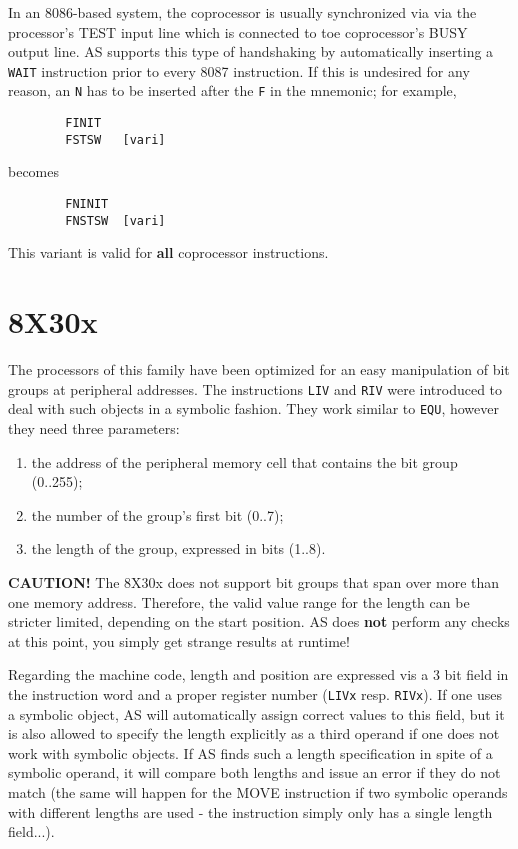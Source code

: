 \documentclass[12pt,twoside]{report}
\newcommand{\bb}[1]{{\bf #1}}
\newcommand{\tty}[1]{{\tt #1}}
\begin{document}
In an 8086-based system, the coprocessor is usually synchronized via
via the processor's TEST input line which is connected to toe
coprocessor's BUSY output line.  AS supports this type of handshaking
by automatically inserting a \tty{WAIT} instruction prior to every 8087
instruction.  If this is undesired for any reason, an \tty{N} has to be
inserted after the \tty{F} in the mnemonic; for example,
\begin{verbatim}
        FINIT
        FSTSW   [vari]
\end{verbatim}
becomes
\begin{verbatim}
        FNINIT
        FNSTSW  [vari]
\end{verbatim}
This variant is valid for \bb{all} coprocessor instructions.


\section{8X30x}
\label{8X30xSpec}

The processors of this family have been optimized for an easy manipulation
of bit groups at peripheral addresses.  The instructions \tty{LIV} and
\tty{RIV} were introduced to deal with such objects in a symbolic fashion.
They work similar to \tty{EQU}, however they need three parameters:
\begin{enumerate}
\item{the address of the peripheral memory cell that contains the bit
     group (0..255);}
\item{the number of the group's first bit (0..7);}
\item{the length of the group, expressed in bits (1..8).}
\end{enumerate}
\bb{CAUTION!} The 8X30x does not support bit groups that span over more
than one memory address.  Therefore, the valid value range for the
length can be stricter limited, depending on the start position.  AS
does \bb{not} perform any checks at this point, you simply get strange
results at runtime!

Regarding the machine code, length and position are expressed vis a 3
bit field in the instruction word and a proper register number (\tty{LIVx}
resp. \tty{RIVx}).  If one uses a symbolic object, AS will automatically
assign correct values to this field, but it is also allowed to
specify the length explicitly as a third operand if one does not work
with symbolic objects.  If AS finds such a length specification in
spite of a symbolic operand, it will compare both lengths and issue
an error if they do not match (the same will happen for the MOVE
instruction if two symbolic operands with different lengths are used
- the instruction simply only has a single length field...).
\end{document}
